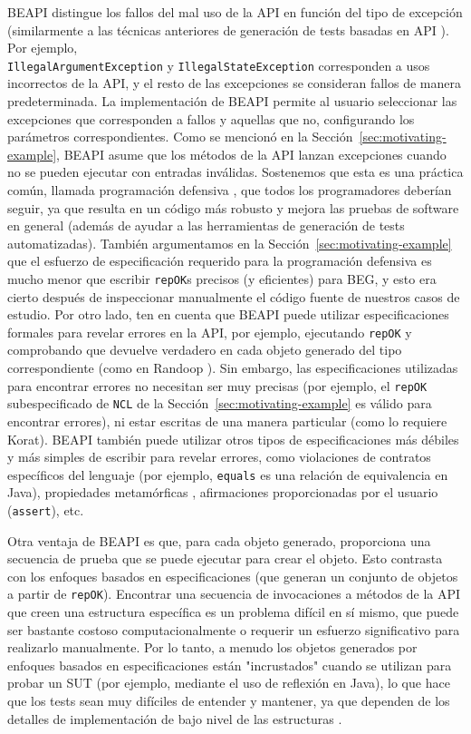 \textsf{BEAPI} distingue los fallos del mal uso de la API en función del tipo de excepción (similarmente a las técnicas anteriores de generación de tests basadas en API \cite{Pacheco07}). 
Por ejemplo, \\
\texttt{IllegalArgumentException} y \texttt{IllegalStateException} corresponden a usos incorrectos de la API, y el resto de las excepciones se consideran fallos de manera predeterminada. 
La implementación de \textsf{BEAPI} permite al usuario seleccionar las excepciones que corresponden a fallos y aquellas que no, configurando los parámetros correspondientes. 
Como se mencionó en la Sección~\ref{sec:motivating-example}, \textsf{BEAPI} asume que los métodos de la API lanzan excepciones cuando no se pueden ejecutar con entradas inválidas. 
Sostenemos que esta es una práctica común, llamada programación defensiva \cite{Liskov00}, 
que todos los programadores deberían seguir, ya que resulta en un código más robusto y 
mejora las pruebas de software en general \cite{Ammann16} (además de ayudar a las herramientas de generación de tests automatizadas). 
También argumentamos en la Sección~\ref{sec:motivating-example} que el esfuerzo de especificación requerido para la programación defensiva es mucho menor que escribir \texttt{repOK}s precisos (y eficientes) para BEG, 
y esto era cierto después de inspeccionar manualmente el código fuente de nuestros casos de estudio. 
Por otro lado, ten en cuenta que \textsf{BEAPI} puede utilizar especificaciones formales para revelar errores en la API, por ejemplo, 
ejecutando \texttt{repOK} y comprobando que devuelve verdadero en cada objeto generado del tipo correspondiente (como en Randoop \cite{Pacheco07}). 
Sin embargo, las especificaciones utilizadas para encontrar errores no necesitan ser muy precisas (por ejemplo, el \texttt{repOK} subespecificado de \texttt{NCL} de la Sección~\ref{sec:motivating-example} 
es válido para encontrar errores), ni estar escritas de una manera particular (como lo requiere \textsf{Korat}). 
\textsf{BEAPI} también puede utilizar otros tipos de especificaciones más débiles y 
más simples de escribir para revelar errores, como violaciones de contratos específicos del lenguaje 
(por ejemplo, \texttt{equals} es una relación de equivalencia en Java), propiedades metamórficas \cite{Chen19}, afirmaciones proporcionadas por el usuario (\texttt{assert}), etc.

Otra ventaja de \textsf{BEAPI} es que, para cada objeto generado, proporciona una secuencia de prueba que se puede ejecutar para crear el objeto. 
Esto contrasta con los enfoques basados en especificaciones (que generan un conjunto de objetos a partir de \texttt{repOK}). 
Encontrar una secuencia de invocaciones a métodos de la API que creen una estructura específica es un problema difícil en sí mismo, 
que puede ser bastante costoso computacionalmente \cite{Braione17} o requerir un esfuerzo significativo para realizarlo manualmente. 
Por lo tanto, a menudo los objetos generados por enfoques basados en especificaciones están "incrustados" cuando se utilizan para probar un SUT 
(por ejemplo, mediante el uso de reflexión en Java), lo que hace que los tests sean muy difíciles de entender y mantener, ya que dependen de los detalles de implementación de bajo nivel de las estructuras \cite{Braione17}.

